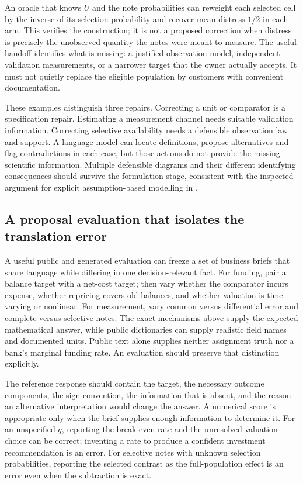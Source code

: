 An oracle that knows $U$ and the note probabilities can reweight each
selected cell by the inverse of its selection probability and recover
mean distress $1/2$ in each arm. This verifies the construction; it is not
a proposed correction when distress is precisely the unobserved quantity
the notes were meant to measure. The useful handoff identifies what is
missing: a justified observation model, independent validation measurements,
or a narrower target that the owner actually accepts. It must not quietly
replace the eligible population by customers with convenient documentation.

These examples distinguish three repairs. Correcting a unit or comparator
is a specification repair. Estimating a measurement channel needs suitable
validation information. Correcting selective availability needs a defensible
observation law and support. A language model can locate definitions,
propose alternatives and flag contradictions in each case, but those actions
do not provide the missing scientific information. Multiple defensible
diagrams and their different identifying consequences should survive the
formulation stage, consistent with the inspected argument for explicit
assumption-based modelling in \citet{exec13_census_credible}.

\subsection{A proposal evaluation that isolates the translation error}

A useful public and generated evaluation can freeze a set of business
briefs that share language while differing in one decision-relevant fact.
For funding, pair a balance target with a net-cost target; then vary whether
the comparator incurs expense, whether repricing covers old balances, and
whether valuation is time-varying or nonlinear. For measurement, vary
common versus differential error and complete versus selective notes.
The exact mechanisms above supply the expected mathematical answer, while
public dictionaries can supply realistic field names and documented units.
Public text alone supplies neither assignment truth nor a bank's marginal
funding rate. An evaluation should preserve that distinction explicitly.

The reference response should contain the target, the necessary outcome
components, the sign convention, the information that is absent, and the
reason an alternative interpretation would change the answer. A numerical
score is appropriate only when the brief supplies enough information to
determine it. For an unspecified $q$, reporting the break-even rate and the
unresolved valuation choice can be correct; inventing a rate to produce a
confident investment recommendation is an error. For selective notes with
unknown selection probabilities, reporting the selected contrast as the
full-population effect is an error even when the subtraction is exact.


